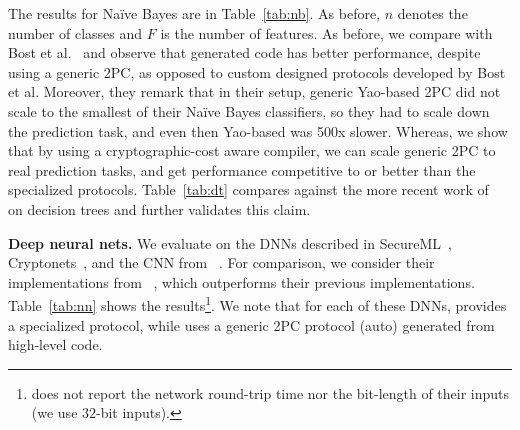 
The results for Na\"{i}ve Bayes are
in Table~\ref{tab:nb}. As before, $n$ denotes the number of classes and $F$ is the number of features.
As before, we compare with Bost et al.~\cite{shafindss} and observe that \tool generated code
has better performance, despite using a generic 2PC,
as opposed to custom designed protocols developed by Bost et
al. Moreover, they remark that in their setup, generic Yao-based 2PC
did not scale to the smallest of their Na\"{i}ve Bayes classifiers, so
they had to scale down the prediction task, and even then Yao-based \mpc
was 500x slower. Whereas, we show that by using a
cryptographic-cost aware compiler, we can scale generic 2PC to real
prediction tasks, and get performance competitive to or better than the
specialized protocols. Table~\ref{tab:dt} 
compares against the more recent work of~\cite{wu}
on decision trees and further validates this claim.

\noindent\textbf{Deep neural nets.}
We evaluate \tool on the DNNs described in SecureML~\cite{secureml},
Cryptonets~\cite{cryptonets}, and the CNN from \minion~\cite{minionn}. For
comparison, we consider their implementations from
\minion~\cite{minionn}, which outperforms their previous
implementations. Table~\ref{tab:nn} shows the
results\footnote{\minion does not report the network round-trip time nor the bit-length of their inputs (we use $32$-bit inputs).}.
We note that for each of these DNNs, \minion provides a
specialized protocol, while \tool uses a generic 2PC protocol
(auto) generated from high-level code.

